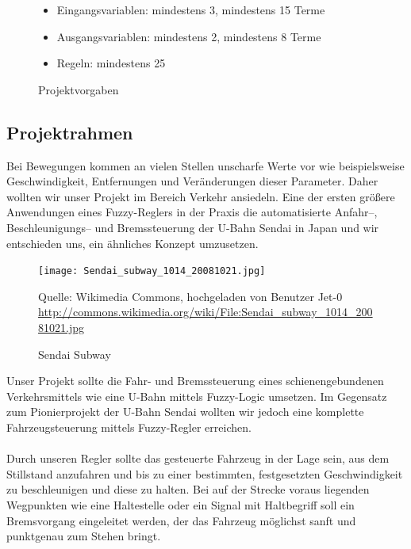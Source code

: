 \documentclass[10pt,a4paper]{article}
\begin{document}
\begin{figure}[htb]
\begin{itemize}
	\item Eingangsvariablen: mindestens 3, mindestens 15 Terme
	\item Ausgangsvariablen: mindestens 2, mindestens 8 Terme
	\item Regeln: mindestens 25
\end{itemize}
\caption{Projektvorgaben}
\label{projektvorgaben}
\end{figure}

\subsection{Projektrahmen}
Bei Bewegungen kommen an vielen Stellen unscharfe Werte vor wie beispielsweise Geschwindigkeit, Entfernungen und Veränderungen dieser Parameter. Daher wollten wir unser Projekt im Bereich Verkehr ansiedeln.
Eine der ersten größere Anwendungen eines Fuzzy-Reglers in der Praxis die automatisierte Anfahr--, Beschleunigungs-- und Bremssteuerung der U-Bahn Sendai in Japan und wir entschieden uns, ein ähnliches Konzept umzusetzen.

\begin{figure}[htb]
\begin{center}
\leavevmode
\texttt{[image: Sendai\_subway\_1014\_20081021.jpg]}
\caption[Sendai Subway]{Sendai Subway}
\label{Sendai Subway}

\begin{footnotesize}
Quelle: Wikimedia Commons, hochgeladen von Benutzer Jet-0
\url{http://commons.wikimedia.org/wiki/File:Sendai_subway_1014_20081021.jpg}
\end{footnotesize}

\end{center}
\end{figure}

Unser Projekt sollte die Fahr- und Bremssteuerung eines schienengebundenen Verkehrsmittels wie eine U-Bahn mittels Fuzzy-Logic umsetzen.
Im Gegensatz zum Pionierprojekt der U-Bahn Sendai wollten wir jedoch eine komplette Fahrzeugsteuerung mittels Fuzzy-Regler erreichen.
\paragraph{}
Durch unseren Regler sollte das gesteuerte Fahrzeug in der Lage sein, aus dem Stillstand anzufahren und bis zu einer bestimmten, festgesetzten Geschwindigkeit zu beschleunigen und diese zu halten. Bei auf der Strecke voraus liegenden Wegpunkten wie eine Haltestelle oder ein Signal mit Haltbegriff soll ein Bremsvorgang eingeleitet werden, der das Fahrzeug möglichst sanft und punktgenau zum Stehen bringt.
\end{document}

